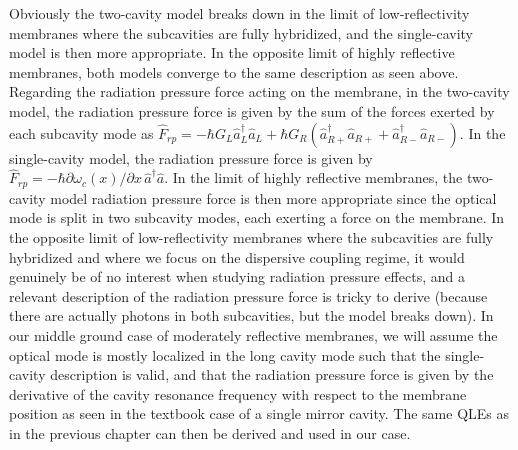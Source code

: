 Obviously the two-cavity model breaks down in the limit of low-reflectivity membranes where the subcavities are fully hybridized, and the single-cavity model is then more appropriate. In the opposite limit of highly reflective membranes, both models converge to the same description as seen above. Regarding the radiation pressure force acting on the membrane, in the two-cavity model, the radiation pressure force is given by the sum of the forces exerted by each subcavity mode as \( \hat F_{rp} = - \hbar G_L \hat a_L^\dagger \hat a_L + \hbar G_R (\hat a_{R+}^\dagger \hat a_{R+} + \hat a_{R-}^\dagger \hat a_{R-})\). In the single-cavity model, the radiation pressure force is given by \( \hat F_{rp} = - \hbar \partial \omega_c(x)/\partial x \, \hat a^\dagger \hat a\). In the limit of highly reflective membranes, the two-cavity model radiation pressure force is then more appropriate since the optical mode is split in two subcavity modes, each exerting a force on the membrane. In the opposite limit of low-reflectivity membranes where the subcavities are fully hybridized and where we focus on the dispersive coupling regime, it would genuinely be of no interest when studying radiation pressure effects, and a relevant description of the radiation pressure force is tricky to derive (because there are actually photons in both subcavities, but the model breaks down). In our middle ground case of moderately reflective membranes, we will assume the optical mode is mostly localized in the long cavity mode such that the single-cavity description is valid, and that the radiation pressure force is given by the derivative of the cavity resonance frequency with respect to the membrane position as seen in the textbook case of a single mirror cavity. The same QLEs as in the previous chapter can then be derived and used in our case. 










\newpage 